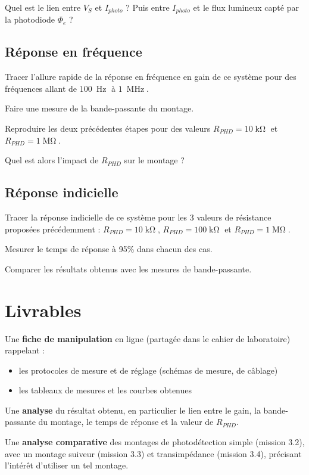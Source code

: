 \Quest Quel est le lien entre $V_S$ et $I_{photo}$ ? Puis entre $I_{photo}$ et le flux lumineux capté par la photodiode $\Phi_e$ ?

\subsection{Réponse en fréquence}

\Manip Tracer l'allure rapide de la réponse en fréquence en gain de ce système pour des fréquences allant de $100~\operatorname{Hz}$ à $1~\operatorname{MHz}$.

\Manip Faire une mesure de la bande-passante du montage.

\Manip Reproduire les deux précédentes étapes pour des valeurs $R_{PHD} = 10\operatorname{k\Omega}$ et $R_{PHD} = 1\operatorname{M\Omega}$. 

\Quest Quel est alors l'impact de $R_{PHD}$ sur le montage ?

\subsection{Réponse indicielle}

\Manip Tracer la réponse indicielle de ce système pour les 3 valeurs de résistance proposées précédemment : $R_{PHD} = 10\operatorname{k\Omega}$, $R_{PHD} = 100\operatorname{k\Omega}$ et $R_{PHD} = 1\operatorname{M\Omega}$.

\Manip Mesurer le temps de réponse à 95\% dans chacun des cas.

\Quest Comparer les résultats obtenus avec les mesures de bande-passante.


\section{Livrables}

Une \textbf{fiche de manipulation} en ligne (partagée dans le cahier de laboratoire) rappelant :

\begin{itemize}
	\item les protocoles de mesure et de réglage (schémas de mesure, de câblage)
	\item les tableaux de mesures et les courbes obtenues
\end{itemize}

Une \textbf{analyse} du résultat obtenu, en particulier le lien entre le gain, la bande-passante du montage, le temps de réponse et la valeur de $R_{PHD}$.

Une \textbf{analyse comparative} des montages de photodétection simple (mission 3.2), avec un montage suiveur (mission 3.3) et transimpédance (mission 3.4), précisant l'intérêt d'utiliser un tel montage.



